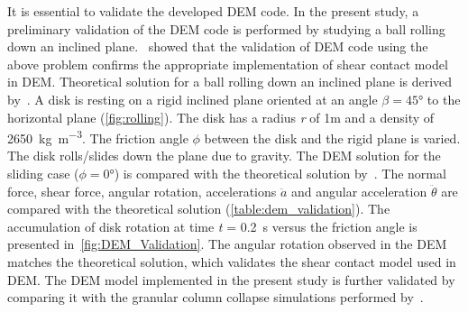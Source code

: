 It is essential to validate the developed DEM code. In the present study, a 
preliminary validation of the DEM code is performed by studying a ball rolling 
down an inclined plane.~\citet{O'Sullivan2003} showed that the validation of 
DEM code using the above problem confirms the appropriate implementation of 
shear contact model in DEM. Theoretical solution for a ball rolling down an 
inclined plane is derived by~\cite{Ke1995}. A disk is resting on a rigid 
inclined plane oriented at an angle $\beta = 45\si{\degree}$ to the horizontal 
plane (\cref{fig:rolling}). The disk has a radius \textit{r} of 1\si{m} and a 
density of 2650~\si{\kg\per\m\cubed}. The friction angle $\phi$ between the 
disk and the rigid plane is varied. The disk rolls/slides down the plane due to 
gravity. The DEM solution for the sliding case ($\phi=0\si{\degree}$) is 
compared with the theoretical solution by~\citet{Ke1995}. The normal force, 
shear force, angular rotation, accelerations $\ddot{a}$ and angular 
acceleration $\ddot{\theta}$ are compared with the theoretical solution 
(\cref{table:dem_validation}). The accumulation of disk rotation at time 
\textit{t} = 0.2~\si{\s} versus the friction angle is presented 
in~\cref{fig:DEM_Validation}. The angular rotation observed in the DEM matches 
the theoretical solution, which validates the shear contact model used in DEM. 
The DEM model implemented in the present study is further validated by 
comparing it with the granular column collapse simulations performed 
by~\citet{Zenit2005}.  


